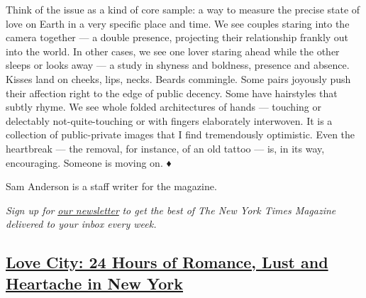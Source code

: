Think of the issue as a kind of core sample: a way to measure the
precise state of love on Earth in a very specific place and time. We see
couples staring into the camera together --- a double presence,
projecting their relationship frankly out into the world. In other
cases, we see one lover staring ahead while the other sleeps or looks
away --- a study in shyness and boldness, presence and absence. Kisses
land on cheeks, lips, necks. Beards commingle. Some pairs joyously push
their affection right to the edge of public decency. Some have
hairstyles that subtly rhyme. We see whole folded architectures of hands
--- touching or delectably not-quite-touching or with fingers
elaborately interwoven. It is a collection of public-private images that
I find tremendously optimistic. Even the heartbreak --- the removal, for
instance, of an old tattoo --- is, in its way, encouraging. Someone is
moving on. ♦

Sam Anderson is a staff writer for the magazine.

\emph{Sign up for}
\href{http://www.nytimes3xbfgragh.onion/newsletters/magazine}{\emph{our
newsletter}} \emph{to get the best of The New York Times Magazine
delivered to your inbox every week.}

\hypertarget{love-city-24-hours-of-romance-lust-and-heartache-in-new-york}{%
\subsection{\texorpdfstring{\href{https://www.nytimes3xbfgragh.onion/interactive/2018/06/07/magazine/new-york-love-city.html}{Love
City: 24 Hours of Romance, Lust and Heartache in New
York}}{Love City: 24 Hours of Romance, Lust and Heartache in New York}}\label{love-city-24-hours-of-romance-lust-and-heartache-in-new-york}}

